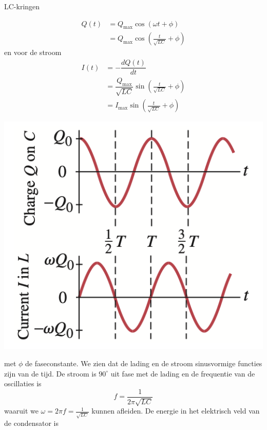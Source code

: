 \begin{app}[LC-kringen]{LC-kringen}
    \begin{minipage}{.71\textwidth}
        \begin{align*}
            Q(t) &= Q_{\max}\cos(\omega t + \phi) \\
                 &= Q_{\max}\cos(\tfrac{t}{\sqrt{LC}} + \phi)
        \end{align*}
        \hspace{-0.6cm} en voor de stroom
        \begin{align*}
            I(t) &= -\dfrac{dQ(t)}{dt} \\
                 &= \dfrac{Q_{\max}}{\sqrt{LC}}\sin(\tfrac{t}{\sqrt{LC}} + \phi) \\
                 &= I_{\max}\sin(\tfrac{t}{\sqrt{LC}} + \phi)
        \end{align*}
        \vspace{0.1cm}
    \end{minipage}
    \begin{minipage}{.25\textwidth}
        \vspace{-0.3cm}\hspace{-0.45cm}\includegraphics[scale = 0.45]{Images/Magnetisme/LCKringGrafiek}
    \end{minipage}

    \vspace{-0.4cm}

    \noindent met $\phi$ de faseconstante. We zien dat de lading en de stroom sinusvormige functies zijn van de tijd. De stroom is $90^{\circ}$ uit fase met de lading en de frequentie van de oscillaties is
    \begin{equation*}
        f = \dfrac{1}{2\pi\sqrt{LC}}
    \end{equation*}
    waaruit we $\omega = 2\pi f = \tfrac{1}{\sqrt{LC}}$ kunnen afleiden. De energie in het elektrisch veld van de condensator is


\end{app}

